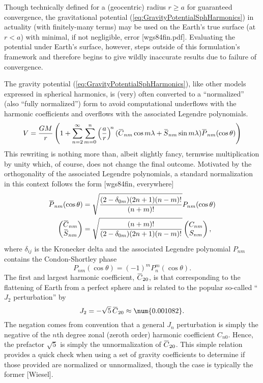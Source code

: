 \documentclass[11pt,dvipsnames]{thesis}
\newcommand{\overbar}[1]{\mkern 1.5mu\overline{\mkern-1.5mu#1\mkern-1.5mu}\mkern 1.5mu}
\begin{document}
Though technically defined for a (geocentric) radius $r \geq a$ for guaranteed convergence, the gravitational potential (\ref{eq:GravityPotentialSphHarmonics}) in actuality (with finitely-many terms) may be used on the Earth's true surface (at $r < a$) with minimal, if not negligible, error [wgs84fin.pdf]. Evaluating the potential under Earth's surface, however, steps outside of this formulation's framework and therefore begins to give wildly inaccurate results due to failure of convergence.

The gravity potential (\ref{eq:GravityPotentialSphHarmonics}), like other models expressed in spherical harmonics, is (very) often converted to a ``normalized'' (also ``fully normalized'') form to avoid computational underflows with the harmonic coefficients and overflows with the associated Legendre polynomials.
\begin{equation}
V = \frac{GM}{r} \left(1 + \sum_{n = 2}^\infty \sum_{m = 0}^n \left(\frac{a}{r}\right)^{\!n}(\overbar{C}_{nm} \cos m\lambda + \overbar{S}_{nm} \sin m\lambda) \overbar{P}_{nm}(\cos\theta)\right) \label{eq:GravityPotentialSphHarmonicsNormalized}
\end{equation}
This rewriting is nothing more than, albeit slightly fancy, termwise multiplication by unity which, of course, does not change the final outcome. 
Motivated by the orthogonality of the associated Legendre polynomials, a standard normalization in this context follows the form [wgs84fin, everywhere]
\begin{align}
\overbar{P}_{nm}(\cos\theta) &= \sqrt{\frac{(2 - \delta_{0m})(2n+1)(n-m)!}{(n+m)!}} P_{nm}(\cos\theta) \\
\begin{pmatrix}\overbar{C}_{nm} \\ \overbar{S}_{nm}\end{pmatrix} &= \sqrt{\frac{(n+m)!}{(2 - \delta_{0m})(2n+1)(n-m)!}} \begin{pmatrix}C_{nm} \\ S_{nm}\end{pmatrix},
\end{align}
where $\delta_{ij}$ is the Kronecker delta and the associated Legendre polynomial $P_{nm}$ contains the Condon-Shortley phase
\begin{equation}
P_{nm}(\cos\theta) = (-1)^m P_n^m(\cos\theta).
\end{equation}
The first and largest harmonic coefficient, $\overbar{C}_{20}$, is that corresponding to the flattening of Earth from a perfect sphere and is related to the popular so-called ``$J_2$ perturbation'' by
\begin{equation}
J_2 = -\sqrt{5} \, \overbar{C}_{20} \approx \num{0.001082}.
\end{equation}
The negation comes from convention that a general $J_n$ perturbation is simply the negative of the $n$th degree zonal (zeroth order) harmonic coefficient $C_{n0}$. Hence, the prefactor $\sqrt{5}$ is simply the unnormalization of $\overbar{C}_{20}$. This simple relation provides a quick check when using a set of gravity coefficients to determine if those provided are normalized or unnormalized, though the case is typically the former [Wiesel].
\end{document}
